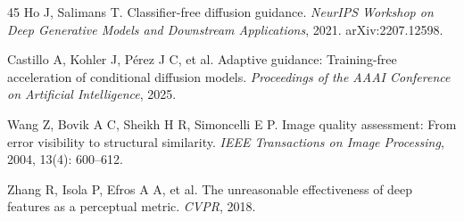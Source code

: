 \documentclass[times,twocolumn,final]{elsarticle}
\providecommand{\DIFadd}[1]{{\protect\color{blue} \sf #1}} %
\providecommand{\DIFaddbegin}{} %
\providecommand{\DIFaddend}{} %
\begin{document}
\begin{thebibliography}{45}
Ho J, Salimans T. Classifier-free diffusion guidance. \textit{NeurIPS Workshop on Deep Generative Models and Downstream Applications}, 2021. arXiv:2207.12598.

Castillo A, Kohler J, P\'erez J C, et al. Adaptive guidance: Training-free acceleration of conditional diffusion models. \textit{Proceedings of the AAAI Conference on Artificial Intelligence}, 2025.

 







Wang Z, Bovik A C, Sheikh H R, Simoncelli E P. Image quality assessment: From error visibility to structural similarity. \textit{IEEE Transactions on Image Processing}, 2004, 13(4): 600--612.

Zhang R, Isola P, Efros A A,   \DIFaddbegin \DIFadd{et al}\DIFaddend . The unreasonable effectiveness of deep features as a perceptual metric. \textit{  \DIFaddbegin \DIFadd{CVPR}\DIFaddend }, 2018.

 

 \end{thebibliography}
\DIFaddbegin \endgroup
 \DIFaddend
\end{document}
